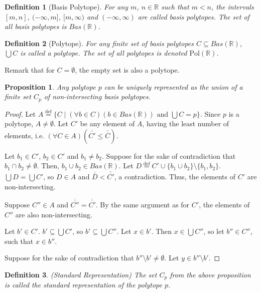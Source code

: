 \documentclass{article}
\newtheorem*{definition}{Definition}
\newtheorem*{proposition}{Proposition}
\newcommand{\R}{\mathbb{R}}
\newcommand{\Pol}{\text{Pol}}
\newcommand{\eqdef}{\stackrel{\text{def}}{=}}
\begin{document}
\begin{definition}[Basis Polytope]
For any $m$, $n \in \R$ such that $m < n$, the intervals $[m, n]$, $(-\infty, m]$, $[m, \infty)$ and $(-\infty, \infty)$ are called \emph{basis polytopes}. The set of all basis polytopes is $Bas(\R)$.
\end{definition}

\begin{definition}[Polytope]
For any finite set of basis polytopes $C \subseteq Bas(\R)$, $\bigcup C$ is called a \emph{polytope}. The set of all polytopes is denoted $\Pol(\R)$.
\end{definition}
Remark that for $C = \emptyset$, the empty set is also a polytope.

\begin{proposition}
Any polytope $p$ can be uniquely represented as the union of a finite set $C_p$ of non-intersecting basis polytopes.
\end{proposition}
\begin{proof}
  Let $A \eqdef \{ C \mid (\forall b \in C)(b \in Bas(\R)) \text{ and } \bigcup C = p\}$. Since $p$ is a polytope, $A \neq \emptyset$. Let $C'$ be any element of $A$, having the least number of elements, i.e. $(\forall C \in A)(\overline{\overline{C'}} \leq \overline{\overline{C}})$.

  Let $b_1 \in C'$, $b_2 \in C'$ and $b_1 \neq b_2$. Suppose for the sake of contradiction that $b_1 \cap b_2 \neq \emptyset$. Then, $b_1 \cup b_2 \in Bas(\R)$. Let $D \eqdef C' \cup \{b_1 \cup b_2\} \setminus \{b_1, b_2\}$. $\bigcup D = \bigcup C'$, so $D \in A$ and $\overline{\overline{D}} < \overline{\overline{C'}}$, a contradiction. Thus, the elements of $C'$ are non-intersecting.

  Suppose $C'' \in A$ and $\overline{\overline{C''}} = \overline{\overline{C'}}$. By the same argument as for $C'$, the elements of $C''$ are also non-intersecting.

  Let $b' \in C'$. $b' \subseteq \bigcup C'$, so $b' \subseteq \bigcup C''$. Let $x \in b'$. Then $x \in \bigcup C''$, so let $b'' \in C''$, such that $x \in b''$.

  Suppose for the sake of contradiction that $b'' \setminus b' \neq \emptyset$. Let $y \in b'' \setminus b'$.
\end{proof}

\begin{definition}(Standard Representation)
The set $C_p$ from the above proposition is called the \emph{standard representation} of the polytope $p$.
\end{definition}
\end{document}
